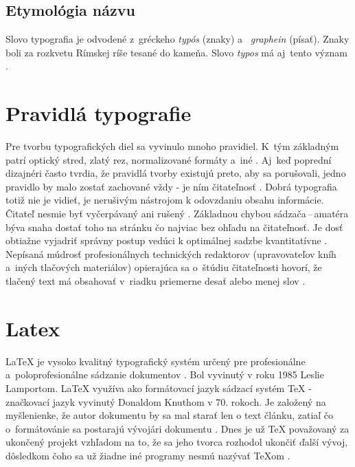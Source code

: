 \documentclass[a4paper,11pt, titlepage]{article}
\begin{document}
\subsection{Etymológia názvu} 
Slovo typografia je odvodené z~gréckeho \emph{typós} (znaky) a~ \emph{graphein} (písať). Znaky boli za rozkvetu Rímskej ríše tesané do kameňa. Slovo \emph{typos} má aj~tento význam \cite{Olsak:Typografie_co_to_je}.

\section{Pravidlá typografie}
Pre tvorbu typografických diel sa vyvinulo mnoho pravidiel. K~tým základným patrí optický stred, zlatý rez, normalizované formáty 
a~iné \cite{Culakova:bakalarka}. Aj~keď poprední dizajnéri často tvrdia, že pravidlá tvorby existujú preto, aby sa porušovali, jedno pravidlo by malo zostať 
zachované vždy - je ním čitateľnosť \cite{Samara:Graficky_design}. Dobrá typografia totiž nie je vidieť, je nerušivým nástrojom k odovzdaniu obsahu informácie. Čitateľ nesmie byť vyčerpávaný ani rušený \cite{Olsak:Typografie_co_to_je}. Základnou chybou sádzača\,--\,amatéra býva snaha dostať toho na stránku čo najviac bez ohľadu na čitateľnosť. Je dosť obtiažne vyjadriť správny postup vedúci k optimálnej sadzbe kvantitatívne \cite{Vesely:Exkurze_do_taju}. Nepísaná múdrosť profesionálnych technických redaktorov (upravovateľov kníh a~iných tlačových materiálov) o\-pie\-ra\-jú\-ca sa o~štúdiu čitateľnosti hovorí, že tlačený text má obsahovať v~riadku priemerne desať alebo menej slov \cite{Durst:Vytvareni_rejstriku}.

\section{Latex}
{\LaTeX} je vysoko kvalitný typografický systém určený pre profesionálne a~poloprofesionálne sádzanie dokumentov \cite{Martinek:Latexove_speciality}. Bol vyvinutý v roku 1985 Leslie Lamportom. {\LaTeX} využíva ako formátovací jazyk sádzací systém {\TeX} - 
značkovací jazyk vyvinutý Donaldom Knuthom v 70. rokoch. Je založený na myšlenienke, že autor dokumentu by sa mal starať len o text článku, zatiaľ čo o~formátovánie sa postarajú vývojári dokumentu \cite{Mittelbach:An_Introduction_to_Latex}. Dnes je už {\TeX} považovaný za ukončený projekt vzhľadom na to, že sa jeho tvorca rozhodol ukončiť ďalší vývoj, dôsledkom čoho sa už žiadne iné programy nesmú nazývať \TeX om \cite{Syropoulos:Zbornik}.

\newpage

\end{document}
